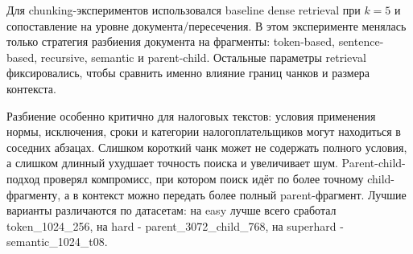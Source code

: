 \documentclass[a4paper,12pt]{article}
\begin{document}
Для chunking-экспериментов использовался baseline dense retrieval при $k=5$ и сопоставление на уровне документа/пересечения. В этом эксперименте менялась только стратегия разбиения документа на фрагменты: token-based, sentence-based, recursive, semantic и parent-child. Остальные параметры retrieval фиксировались, чтобы сравнить именно влияние границ чанков и размера контекста.

Разбиение особенно критично для налоговых текстов: условия применения нормы, исключения, сроки и категории налогоплательщиков могут находиться в соседних абзацах. Слишком короткий чанк может не содержать полного условия, а слишком длинный ухудшает точность поиска и увеличивает шум. Parent-child-подход проверял компромисс, при котором поиск идёт по более точному child-фрагменту, а в контекст можно передать более полный parent-фрагмент. Лучшие варианты различаются по датасетам: на easy лучше всего сработал token\_1024\_256, на hard - parent\_3072\_child\_768, на superhard - semantic\_1024\_t08.
\end{document}
